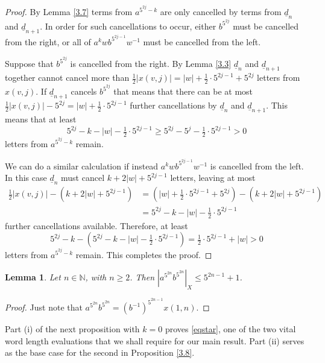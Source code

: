 \documentclass[twoside,11pt]{amsart}
\numberwithin{equation}{section}
\newtheorem{lemma}[theorem]{Lemma}
\theoremstyle{definition}
\newcommand {\N}{\mathbb N}
\newcommand{\1}{\mathbbm{1}}
\newcommand{\pdt}{\underline}
\begin{document}
	\begin{proof}
		By Lemma \ref{3.7} terms from $a^{5^{2j}-k}$ are only cancelled by terms from $\pdt{d}_n$ and $\pdt{d}_{n+1}$.		
		In order for such cancellations to occur, either $b^{5^{2j}}$ must be cancelled from the right, or all of $a^kwb^{5^{2j-1}}w^{-1}$ must be cancelled from the left.
		
		Suppose that $b^{5^{2j}}$ is cancelled from the right. By Lemma \ref{3.3} $\pdt{d}_n$ and $\pdt{d}_{n+1}$ together cannot cancel more than 
		$\frac{1}{2}|x(v,j)| = |w| + \tfrac{1}{2} \cdot 5^{2j-1} +  5^{2j}$
		letters from $x(v,j)$. If $\pdt{d}_{n+1}$ cancels $b^{5^{2j}}$ that means that there can be at most 
		$\frac{1}{2}|x(v,j)| - 5^{2j} = |w| + \frac{1}{2} \cdot 5^{2j-1}$
		further cancellations by $\pdt{d}_n$ and $\pdt{d}_{n+1}$. This means that at least 
		$$5^{2j} - k - |w| - \tfrac{1}{2} \cdot 5^{2j-1} \geq 5^{2j} - 5^{j} - \tfrac{1}{2}\cdot5^{2j-1} >0$$
		letters from $a^{5^{2j} - k}$ remain.
		
		We can do a similar calculation if instead  $a^kwb^{5^{2j-1}}w^{-1}$ is cancelled from the left. In this case $\pdt{d}_n$ must cancel $k+ 2|w| + 5^{2j-1}$ letters, leaving at most
		\begin{align*}
			\tfrac{1}{2}|x(v,j)| - (k+2|w| + 5^{2j-1}) &=  (|w| + \tfrac{1}{2} \cdot 5^{2j-1} +  5^{2j}) - (k+ 2|w| + 5^{2j-1}) \\
			&= 5^{2j} - k - |w| - \tfrac{1}{2} \cdot 5^{2j-1}
		\end{align*}
		further cancellations available. Therefore, at least
		$$5^{2j} - k  -(5^{2j} - k - |w| - \tfrac{1}{2} \cdot 5^{2j-1}) = \tfrac{1}{2} \cdot 5^{2j-1} + |w| > 0$$
		letters from $a^{5^{2j}-k}$ remain. This completes the proof.
	\end{proof}
	
	
	
	\begin{lemma}	\label{3.5a}
		Let $n \in \N$, with $n \geq 2$. Then $|a^{5^{2n}} b^{5^{2n}}|_X \leq  5^{2n-1} +1$.
	\end{lemma}
	
	\begin{proof}
		Just note that 
		$a^{5^{2n}}b^{5^{2n}} = (b^{-1})^{5^{2n-1}} x(1, n).$
	\end{proof}
	
	Part (i) of the next proposition with $k=0$ proves \eqref{eqstar}, one of the two vital word length evaluations that we shall require for our main result. Part (ii) serves as the base case for the second in Proposition \ref{3.8}.
	
\end{document}
